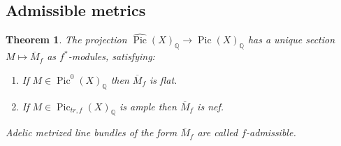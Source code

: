 \documentclass[times, doublespace]{amsart}
\numberwithin{equation}{section}
\theoremstyle{plain}
\newtheorem{theorem}[equation]{Theorem}
\theoremstyle{definition}
\DeclareMathOperator{\Pic}{Pic}
\newcommand{\Q}{\mathbb{Q}}
\begin{document}
\subsection{Admissible metrics}

\begin{theorem}\label{admissible}
The projection $\widehat{\Pic}(X)_{\Q}\to\Pic(X)_{\Q}$ has a unique section $M\mapsto \overline M_f$ as $f^*$-modules, satisfying:
\begin{enumerate}
\item If $M\in\Pic^0(X)_{\Q}$ then $\overline M_f$ is flat.
\item If $M\in\Pic_{tr,f}(X)_{\Q}$ is ample then $\overline M_f$ is nef.
\end{enumerate}
Adelic metrized line bundles of the form $\overline M_f$ are called $f$-admissible.
\end{theorem}
\end{document}
